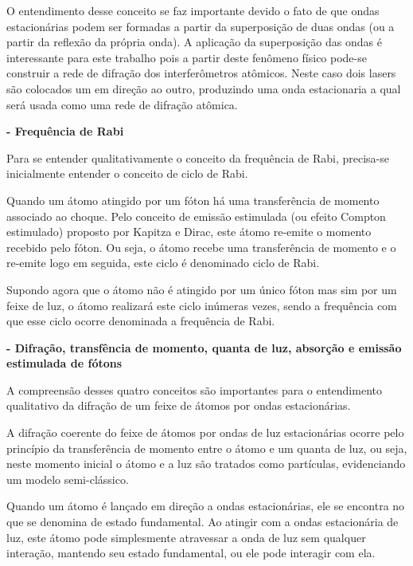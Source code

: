 		\par O entendimento desse conceito se faz importante devido o fato de que ondas estacionárias podem ser formadas a partir da superposição de duas ondas (ou a partir da reflexão da própria onda). A aplicação da superposição das ondas é interessante para este trabalho pois a partir deste fenômeno físico pode-se construir a rede de difração dos interferômetros atômicos. Neste caso dois lasers são colocados um em direção ao outro, produzindo uma onda estacionaria a qual será usada como uma rede de difração atômica\cite{ricardo_2}.

		\textbf{- Frequência de Rabi}

		\par Para se entender qualitativamente o conceito da frequência de Rabi, precisa-se inicialmente entender o conceito de ciclo de Rabi.
		
		\par Quando um átomo atingido por um fóton há uma transferência de momento associado ao choque. Pelo conceito de emissão estimulada (ou efeito Compton estimulado) proposto por Kapitza e Dirac, este átomo re-emite o momento recebido pelo fóton. Ou seja, o átomo recebe uma transferência de momento e o re-emite logo em seguida, este ciclo é denominado ciclo de Rabi.
		
		\par Supondo agora que o átomo não é atingido por um único fóton mas sim por um feixe de luz, o átomo realizará este ciclo inúmeras vezes, sendo a frequência com que esse ciclo ocorre denominada a frequência de Rabi.

		\textbf{- Difração, transfência de momento, quanta de luz, absorção e emissão estimulada de fótons}

		\par A compreensão desses quatro conceitos são importantes para o entendimento qualitativo da difração de um feixe de átomos por ondas estacionárias.
		
		\par A difração coerente do feixe de átomos por ondas de luz estacionárias ocorre pelo princípio da transferência de momento entre o átomo e um quanta de luz, ou seja, neste momento inicial o átomo e a luz são tratados como partículas\cite{ricardo_2}, evidenciando um modelo semi-clássico.
		
		\par Quando um átomo é lançado em direção a ondas estacionárias, ele se encontra no que se denomina de estado fundamental. Ao atingir com a ondas estacionária de luz, este átomo pode simplesmente atravessar a onda de luz sem qualquer interação, mantendo seu estado fundamental, ou ele pode interagir com ela\cite{ricardo_2}. 
		

